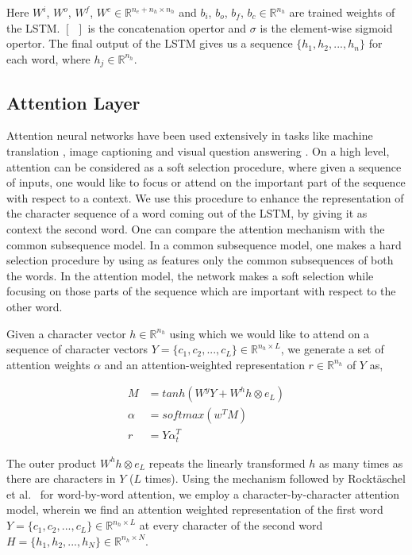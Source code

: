 \documentclass[11pt,letterpaper]{article}
\begin{document}
Here $W^i$, $W^o$, $W^f$, $W^c \in  \mathbb{R}^{n_e+n_h \times n_h}$ and $b_i$, $b_o$, $b_f$, $b_c \in \mathbb{R}^{n_h}$ are trained weights of the LSTM. $[\enspace]$ is the concatenation opertor and $\sigma$ is the element-wise sigmoid opertor. The final output of the LSTM gives us a sequence $\{h_1, h_2, ..., h_n\}$ for each word, where $h_j \in \mathbb{R}^{n_h}$.

\subsection{Attention Layer}

Attention neural networks have been used extensively in tasks like machine translation \cite{mtattention}, image captioning \cite{cpattention} and visual question answering \cite{stackedattention}. On a high level, attention can be considered as a soft selection procedure, where given a sequence of inputs, one would like to focus or attend on the important part of the sequence with respect to a context. We use this procedure to enhance the representation of the character sequence of a word coming out of the LSTM, by giving it as context the second word. One can compare the attention mechanism with the common subsequence model. In a common subsequence model, one makes a hard selection procedure by using as features only the common subsequences of both the words. In the attention model, the network makes a soft selection while focusing on those parts of the sequence which are important with respect to the other word.

Given a character vector $h \in  \mathbb{R}^{n_h}$ using which we would like to attend on a sequence of character vectors $Y = \{c_1, c_2, ..., c_L\} \in \mathbb{R}^{n_h \times L}$, we generate a set of attention weights $\alpha$ and an attention-weighted representation $r \in  \mathbb{R}^{n_h}$ of $Y$ as,

\begin{align}
M &= tanh(W^yY + W^hh\otimes e_L) \\
\alpha &= softmax(w^TM) \\
r &= Y\alpha_t^T
\end{align}

The outer product $W^hh\otimes e_L$ repeats the linearly transformed $h$ as many times as there are characters in $Y$ ($L$ times). Using the mechanism followed by Rockt\"aschel et al.~ for word-by-word attention, we employ a character-by-character attention model, wherein we find an attention weighted representation of the first word $Y = \{c_1, c_2, ..., c_L\} \in \mathbb{R}^{n_h \times L}$ at every character of the second word $H = \{h_1, h_2, ..., h_N\} \in \mathbb{R}^{n_h \times N}$.
\end{document}
